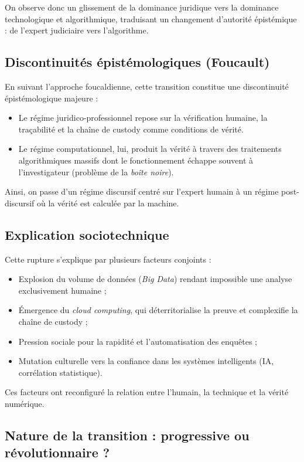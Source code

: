 \documentclass[12pt, a4em]{article}
\begin{document}
	On observe donc un glissement de la dominance juridique vers la dominance technologique et algorithmique, traduisant un changement d’autorité épistémique : de l’expert judiciaire vers l’algorithme.
	
	\subsection{ Discontinuités épistémologiques (Foucault)}
	
	En suivant l’approche foucaldienne, cette transition constitue une discontinuité épistémologique majeure :
	
	\begin{itemize}
		\item Le régime juridico-professionnel repose sur la vérification humaine, la traçabilité et la chaîne de custody comme conditions de vérité.
		\item Le régime computationnel, lui, produit la vérité à travers des traitements algorithmiques massifs dont le fonctionnement échappe souvent à l’investigateur (problème de la \textit{boîte noire}).
	\end{itemize}
	
	Ainsi, on passe d’un régime discursif centré sur l’expert humain à un régime post-discursif où la vérité est calculée par la machine.
	
	\subsection{ Explication sociotechnique}
	
	Cette rupture s’explique par plusieurs facteurs conjoints :
	\begin{itemize}
		\item Explosion du volume de données (\textit{Big Data}) rendant impossible une analyse exclusivement humaine ;
		\item Émergence du \textit{cloud computing}, qui déterritorialise la preuve et complexifie la chaîne de custody ;
		\item Pression sociale pour la rapidité et l’automatisation des enquêtes ;
		\item Mutation culturelle vers la confiance dans les systèmes intelligents (IA, corrélation statistique).
	\end{itemize}
	
	Ces facteurs ont reconfiguré la relation entre l’humain, la technique et la vérité numérique.
	
	\subsection{Nature de la transition : progressive ou révolutionnaire ?}
	
\end{document}
